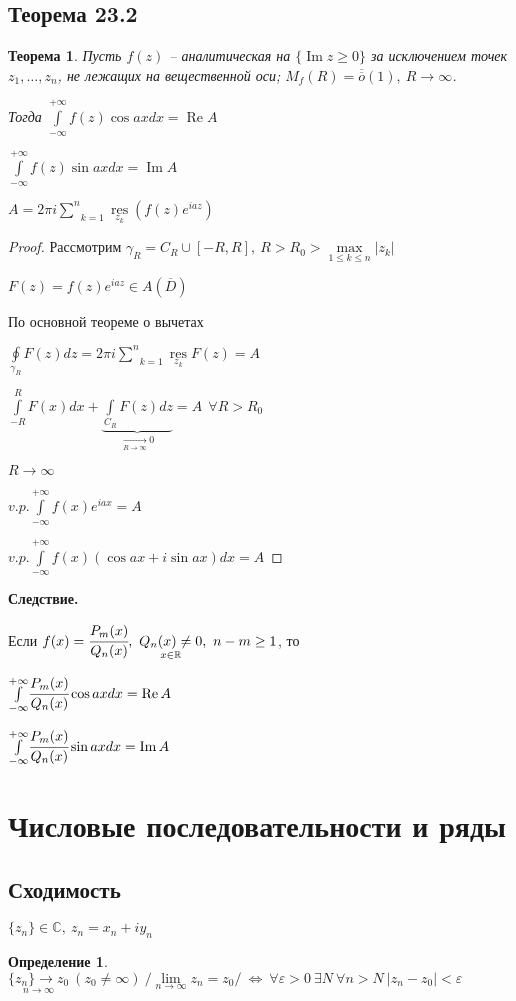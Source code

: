 \documentclass[draft]{article}
\newcommand{\res}{\mathop{\mathrm{res}}\nolimits}
\renewcommand{\bf}{\bfseries}
\newcommand{\R}{\mathbb{R}}
\renewcommand{\C}{\mathbb{C}}
\newcommand{\mint}[2]{\underset{#1}{\overset{#2}{\int}}}
\newcommand{\moint}[1]{\underset{#1}{\oint}}
\newcommand{\msum}[2]{\underset{#1}{\overset{#2}{\sum}}}
\newcommand{\mres}[1]{\underset{#1}{\res}}
\newcommand{\mmax}[1]{\underset{#1}{\max}}
\newcommand{\LRA}{\Leftrightarrow}
\renewcommand{\bar}{\overline}
\renewcommand{\Im}{\mathop{\mathrm{Im}}\nolimits}
\renewcommand{\Re}{\mathop{\mathrm{Re}}\nolimits}
\newcommand{\ninf}[1]{\underset{n\to\infty}{#1}}
\newcommand{\g}{\gamma}
\newcommand{\e}{\varepsilon}
\newcommand{\F}{\ \forall}
\newcommand{\opr}[1]{\begin{opred}#1\end{opred}}
\newcommand{\lra}[1]{\underset{#1}{\longrightarrow}}
\newtheorem*{theor}{Теорема}
\newtheorem*{opred}{Определение}
\theoremstyle{remark}
\begin{document}
\subsection{Теорема 23.2}

\begin{theor}
Пусть $f(z)$ -- аналитическая на $\{\Im z\geq0\}$ за исключением точек $z_1,\ldots,z_n$, не лежащих на вещественной оси; $M_f(R)=\bar{\bar{o}}(1),\ R\to\infty$.

Тогда $\mint{-\infty}{+\infty}f(z)\cos axdx=\Re A$

$\mint{-\infty}{+\infty}f(z)\sin axdx=\Im A$

$A=2\pi i\msum{k=1}{n}\mres{z_k}\left(f(z)e^{iaz}\right)$
\end{theor}
\begin{proof}
Рассмотрим $\g_R=C_R\cup[-R,R],\ R>R_0>\mmax{1\leq k\leq n}|z_k|$

$F(z)=f(z)e^{iaz}\in A(\bar{D})$

По основной теореме о вычетах

$\moint{\g_R}F(z)dz=2\pi i\msum{k=1}{n}\mres{z_k}F(z)=A$

$\mint{-R}{R}F(x)dx+\underset{\lra{R\to\infty}0}{\underbrace{\mint{C_R}{}F(z)dz}}=A\ \F R>R_0$

$R\to\infty$

$v.p.\mint{-\infty}{+\infty}f(x)e^{iax}=A$

$v.p.\mint{-\infty}{+\infty}f(x)(\cos ax+i\sin ax)dx=A$
\end{proof}
{\bf Следствие.}

Если $f(x)=\cfrac{P_m(x)}{Q_n(x)},\ \underset{x\in\R}{Q_n(x)\neq0},\ n-m\geq1$, то

$\mint{-\infty}{+\infty}\cfrac{P_m(x)}{Q_n(x)}\cos axdx=\Re A$

$\mint{-\infty}{+\infty}\cfrac{P_m(x)}{Q_n(x)}\sin axdx=\Im A$

\newpage

\section*{Числовые последовательности и ряды}

\subsection{Сходимость}

$\{z_n\}\in\C,\ z_n=x_n+iy_n$

\opr{$\ninf{\{z_n\}\to z_0}\ (z_0\neq\infty)\ /\ninf{\lim}z_n=z_0/\ \LRA\ \forall \e>0\ \exists N\ \forall n>N\ |z_n-z_0|<\e$
}
\end{document}
